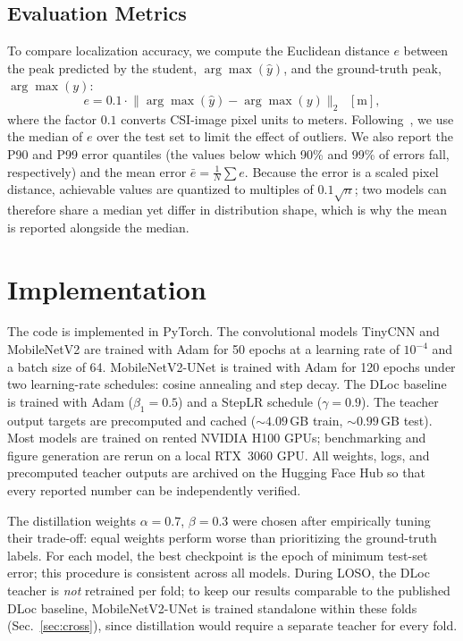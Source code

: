 \documentclass[conference]{IEEEtran}
\begin{document}
\subsection{Evaluation Metrics}
To compare localization accuracy, we compute the Euclidean distance $e$ between the peak predicted by the student, $\arg\max(\hat{y})$, and the ground-truth peak, $\arg\max(y)$:
\begin{equation}
e = 0.1 \cdot \lVert \arg\max(\hat{y}) - \arg\max(y) \rVert_2 \;\; [\mathrm{m}],
\label{eq:err}
\end{equation}
where the factor $0.1$ converts CSI-image pixel units to meters. Following~\cite{ayyalasomayajula2020deep}, we use the median of $e$ over the test set to limit the effect of outliers. We also report the P90 and P99 error quantiles (the values below which 90\% and 99\% of errors fall, respectively) and the mean error $\bar{e} = \tfrac{1}{N}\sum e$. Because the error is a scaled pixel distance, achievable values are quantized to multiples of $0.1\sqrt{n}$; two models can therefore share a median yet differ in distribution shape, which is why the mean is reported alongside the median.

\section{Implementation}
The code is implemented in PyTorch. The convolutional models TinyCNN and MobileNetV2 are trained with Adam for 50 epochs at a learning rate of $10^{-4}$ and a batch size of 64. MobileNetV2-UNet is trained with Adam for 120 epochs under two learning-rate schedules: cosine annealing and step decay. The DLoc baseline is trained with Adam ($\beta_1 = 0.5$) and a StepLR schedule ($\gamma = 0.9$). The teacher output targets are precomputed and cached (${\sim}4.09$\,GB train, ${\sim}0.99$\,GB test). Most models are trained on rented NVIDIA H100 GPUs; benchmarking and figure generation are rerun on a local RTX~3060 GPU. All weights, logs, and precomputed teacher outputs are archived on the Hugging Face Hub so that every reported number can be independently verified.

The distillation weights $\alpha = 0.7$, $\beta = 0.3$ were chosen after empirically tuning their trade-off: equal weights perform worse than prioritizing the ground-truth labels. For each model, the best checkpoint is the epoch of minimum test-set error; this procedure is consistent across all models. During LOSO, the DLoc teacher is \emph{not} retrained per fold; to keep our results comparable to the published DLoc baseline, MobileNetV2-UNet is trained standalone within these folds (Sec.~\ref{sec:cross}), since distillation would require a separate teacher for every fold.
\end{document}
